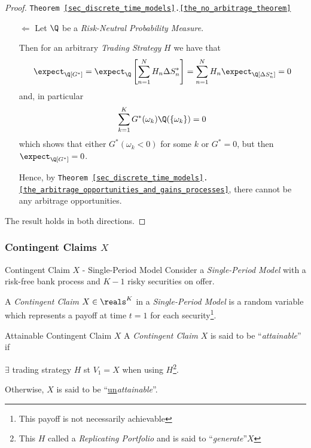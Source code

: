 \documentclass[11pt,a4paper]{article}
\begin{document}
\begin{proof}{\texttt{Theorem \ref{sec_discrete_time_models}.\ref{the_no_arbitrage_theorem}}}
\begin{itemize}
      \item[$\Leftarrow$] Let $\Q$ be a \textit{Risk-Neutral Probability Measure}.
      \par Then for an arbitrary \textit{Trading Strategy} $H$ we have that
      \[ \expect_\Q[G^*]=\expect_\Q\left[\sum_{n=1}^NH_n\Delta S_n^*\right]=\sum_{n=1}^NH_n\expect_\Q[\Delta S_n^*]=0 \]
      and, in particular
      \[ \sum_{k=1}^KG^*(\omega_k)\Q(\{\omega_k\})=0 \]
      which shows that either $G^*(\omega_k<0)$ for some $k$ or $G^*=0$, but then $\expect_\Q[G^*]=0$.
      \par Hence, by \texttt{Theorem \ref{sec_discrete_time_models}.\ref{the_arbitrage_opportunities_and_gains_processes}}, there cannot be any arbitrage opportunities.
    \end{itemize}
    The result holds in both directions.\proved
  \end{proof}

\subsubsection{Contingent Claims $X$}

  \begin{definition}{Contingent Claim $X$ - Single-Period Model}
    Consider a \textit{Single-Period Model} with a risk-free bank process and $K-1$ risky securities on offer.
    \par A \textit{Contingent Claim} $X\in\reals^K$ in a \textit{Single-Period Model} is a random variable which represents a payoff at time $t=1$ for each security\footnote{This payoff is not necessarily achievable}.
  \end{definition}

  \begin{definition}{Attainable Contingent Claim $X$}
    A \textit{Contingent Claim} $X$ is said to be ``\textit{attainable}'' if
    \begin{center}
      $\exists$ trading strategy $H$ st $V_1=X$ when using $H$\footnote{This $H$ called a \textit{Replicating Portfolio} and is said to ``\textit{generate}''$X$}.
    \end{center}
    Otherwise, $X$ is said to be ``\underline{un}\textit{attainable}''.
  \end{definition}
\end{document}
